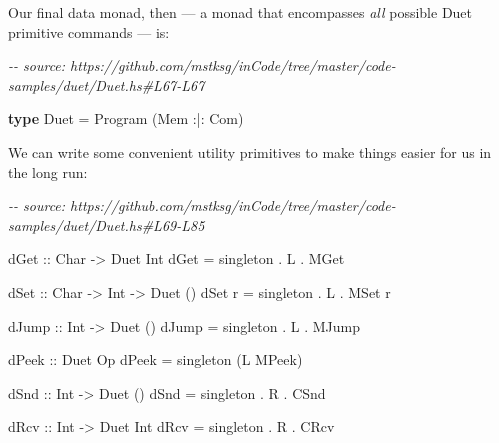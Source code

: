 \documentclass[]{article}
\newenvironment{Shaded}{}{}
\newcommand{\CommentTok}[1]{\textcolor[rgb]{0.38,0.63,0.69}{\textit{#1}}}
\newcommand{\DataTypeTok}[1]{\textcolor[rgb]{0.56,0.13,0.00}{#1}}
\newcommand{\KeywordTok}[1]{\textcolor[rgb]{0.00,0.44,0.13}{\textbf{#1}}}
\newcommand{\NormalTok}[1]{#1}
\newcommand{\OperatorTok}[1]{\textcolor[rgb]{0.40,0.40,0.40}{#1}}
\newcommand{\OtherTok}[1]{\textcolor[rgb]{0.00,0.44,0.13}{#1}}
\begin{document}
Our final data monad, then --- a monad that encompasses \emph{all} possible Duet
primitive commands --- is:

\begin{Shaded}
\begin{Highlighting}[]
\CommentTok{{-}{-} source: https://github.com/mstksg/inCode/tree/master/code{-}samples/duet/Duet.hs\#L67{-}L67}

\KeywordTok{type} \DataTypeTok{Duet} \OtherTok{=} \DataTypeTok{Program}\NormalTok{ (}\DataTypeTok{Mem} \OperatorTok{:|:} \DataTypeTok{Com}\NormalTok{)}
\end{Highlighting}
\end{Shaded}

We can write some convenient utility primitives to make things easier for us in
the long run:

\begin{Shaded}
\begin{Highlighting}[]
\CommentTok{{-}{-} source: https://github.com/mstksg/inCode/tree/master/code{-}samples/duet/Duet.hs\#L69{-}L85}

\OtherTok{dGet ::} \DataTypeTok{Char} \OtherTok{{-}\textgreater{}} \DataTypeTok{Duet} \DataTypeTok{Int}
\NormalTok{dGet }\OtherTok{=}\NormalTok{ singleton }\OperatorTok{.} \DataTypeTok{L} \OperatorTok{.} \DataTypeTok{MGet}

\OtherTok{dSet ::} \DataTypeTok{Char} \OtherTok{{-}\textgreater{}} \DataTypeTok{Int} \OtherTok{{-}\textgreater{}} \DataTypeTok{Duet}\NormalTok{ ()}
\NormalTok{dSet r }\OtherTok{=}\NormalTok{ singleton }\OperatorTok{.} \DataTypeTok{L} \OperatorTok{.} \DataTypeTok{MSet}\NormalTok{ r}

\OtherTok{dJump ::} \DataTypeTok{Int} \OtherTok{{-}\textgreater{}} \DataTypeTok{Duet}\NormalTok{ ()}
\NormalTok{dJump }\OtherTok{=}\NormalTok{ singleton }\OperatorTok{.} \DataTypeTok{L} \OperatorTok{.} \DataTypeTok{MJump}

\OtherTok{dPeek ::} \DataTypeTok{Duet} \DataTypeTok{Op}
\NormalTok{dPeek }\OtherTok{=}\NormalTok{ singleton (}\DataTypeTok{L} \DataTypeTok{MPeek}\NormalTok{)}

\OtherTok{dSnd ::} \DataTypeTok{Int} \OtherTok{{-}\textgreater{}} \DataTypeTok{Duet}\NormalTok{ ()}
\NormalTok{dSnd }\OtherTok{=}\NormalTok{ singleton }\OperatorTok{.} \DataTypeTok{R} \OperatorTok{.} \DataTypeTok{CSnd}

\OtherTok{dRcv ::} \DataTypeTok{Int} \OtherTok{{-}\textgreater{}} \DataTypeTok{Duet} \DataTypeTok{Int}
\NormalTok{dRcv }\OtherTok{=}\NormalTok{ singleton }\OperatorTok{.} \DataTypeTok{R} \OperatorTok{.} \DataTypeTok{CRcv}
\end{Highlighting}
\end{Shaded}
\end{document}
